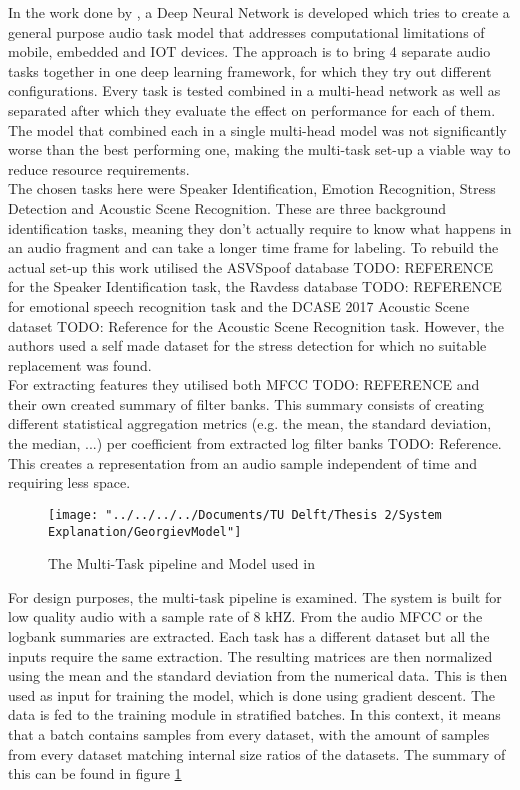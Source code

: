 In the work done by \citep{georgiev2017low}, a Deep Neural Network is developed which tries to create a general purpose audio task model that addresses computational limitations of mobile, embedded and IOT devices. The approach is to bring 4 separate audio tasks together in one deep learning framework, for which they try out different configurations. Every task is tested combined in a multi-head network as well as separated after which they evaluate the effect on performance for each of them. The model that combined each in a single multi-head model was not significantly worse than the best performing one, making the multi-task set-up  a viable way to reduce resource requirements. \\

The chosen tasks here were Speaker Identification, Emotion Recognition, Stress Detection and Acoustic Scene Recognition. These are three background identification tasks, meaning they don't actually require to know what happens in an audio fragment and can take a longer time frame for labeling. To rebuild the actual set-up this work utilised the ASVSpoof database TODO: REFERENCE for the Speaker Identification task, the Ravdess database TODO: REFERENCE for emotional speech recognition task and the DCASE 2017 Acoustic Scene dataset TODO: Reference for the Acoustic Scene Recognition task. However, the authors used a self made dataset for the stress detection for which no suitable replacement was found. \\

For extracting features they utilised both MFCC TODO: REFERENCE and their own created summary of filter banks. This summary consists of creating different statistical aggregation metrics (e.g. the mean, the standard deviation, the median, ...) per coefficient from extracted log filter banks TODO: Reference. This creates a representation from an audio sample independent of time and requiring less space.\\


\begin{figure}
	\centering
	\texttt{[image: "../../../../Documents/TU Delft/Thesis 2/System Explanation/GeorgievModel"]}
	\caption{The Multi-Task pipeline and Model used in \cite{georgiev2017low}}
	\label{fig:georgievmodel}
\end{figure}

For design purposes, the multi-task pipeline is examined. The system is built for low quality audio with a sample rate of 8 kHZ. From the audio MFCC or the logbank summaries are extracted. Each task has a different dataset but all the inputs require the same extraction. The resulting matrices are then normalized using the mean and the standard deviation from the numerical data. This is then used as input for training the model, which is done using gradient descent. The data is fed to the training module in stratified batches. In this context, it means that a batch contains samples from every dataset, with the amount of samples from every dataset matching internal size ratios of the datasets. The summary of this can be found in figure \ref{fig:georgievmodel} \\

